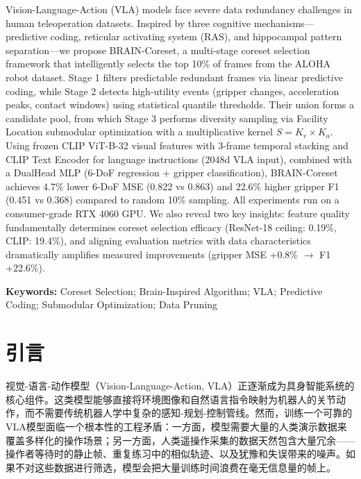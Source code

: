 \documentclass[11pt,a4paper,fontset=none]{ctexart}
\begin{document}
Vision-Language-Action (VLA) models face severe data redundancy challenges in human teleoperation datasets. Inspired by three cognitive mechanisms---predictive coding, reticular activating system (RAS), and hippocampal pattern separation---we propose BRAIN-Coreset, a multi-stage coreset selection framework that intelligently selects the top 10\% of frames from the ALOHA robot dataset. Stage 1 filters predictable redundant frames via linear predictive coding, while Stage 2 detects high-utility events (gripper changes, acceleration peaks, contact windows) using statistical quantile thresholds. Their union forms a candidate pool, from which Stage 3 performs diversity sampling via Facility Location submodular optimization with a multiplicative kernel $S=K_v\times K_a$. Using frozen CLIP ViT-B-32 visual features with 3-frame temporal stacking and CLIP Text Encoder for language instructions (2048d VLA input), combined with a DualHead MLP (6-DoF regression + gripper classification), BRAIN-Coreset achieves 4.7\% lower 6-DoF MSE (0.822 vs 0.863) and 22.6\% higher gripper F1 (0.451 vs 0.368) compared to random 10\% sampling. All experiments run on a consumer-grade RTX 4060 GPU. We also reveal two key insights: feature quality fundamentally determines coreset selection efficacy (ResNet-18 ceiling: 0.19\%, CLIP: 19.4\%), and aligning evaluation metrics with data characteristics dramatically amplifies measured improvements (gripper MSE +0.8\% $\rightarrow$ F1 +22.6\%).

\vspace{0.8em}
\noindent\textbf{Keywords:} Coreset Selection; Brain-Inspired Algorithm; VLA; Predictive Coding; Submodular Optimization; Data Pruning

\clearpage
\tableofcontents

\clearpage
{}  %

\section{引言}

视觉-语言-动作模型（Vision-Language-Action, VLA）正逐渐成为具身智能系统的核心组件。这类模型能够直接将环境图像和自然语言指令映射为机器人的关节动作，而不需要传统机器人学中复杂的感知-规划-控制管线。然而，训练一个可靠的VLA模型面临一个根本性的工程矛盾：一方面，模型需要大量的人类演示数据来覆盖多样化的操作场景；另一方面，人类遥操作采集的数据天然包含大量冗余——操作者等待时的静止帧、重复练习中的相似轨迹、以及犹豫和失误带来的噪声。如果不对这些数据进行筛选，模型会把大量训练时间浪费在毫无信息量的帧上。
\end{document}
